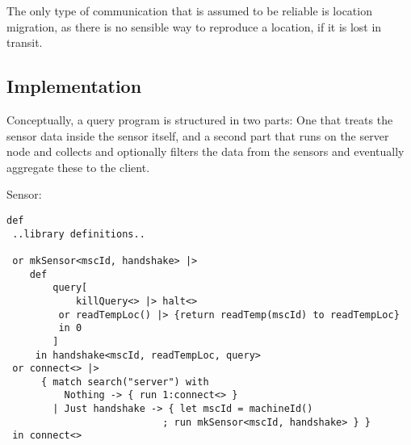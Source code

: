The only type of communication that is assumed to be reliable is location
migration, as there is no sensible way to reproduce a location, if it is lost
in transit.

\subsection*{Implementation}

Conceptually, a query program is structured in two parts: One that
treats the sensor data inside the sensor itself, and a second part
that runs on the server node and collects and optionally filters the data from
the sensors and eventually aggregate these to the client.

Sensor:
\begin{verbatim}
def
 ..library definitions..

 or mkSensor<mscId, handshake> |>
    def
        query[
            killQuery<> |> halt<>
         or readTempLoc() |> {return readTemp(mscId) to readTempLoc}
         in 0
        ]
     in handshake<mscId, readTempLoc, query>
 or connect<> |>
      { match search("server") with
          Nothing -> { run 1:connect<> }
        | Just handshake -> { let mscId = machineId()
                           ; run mkSensor<mscId, handshake> } }
 in connect<>
\end{verbatim}


